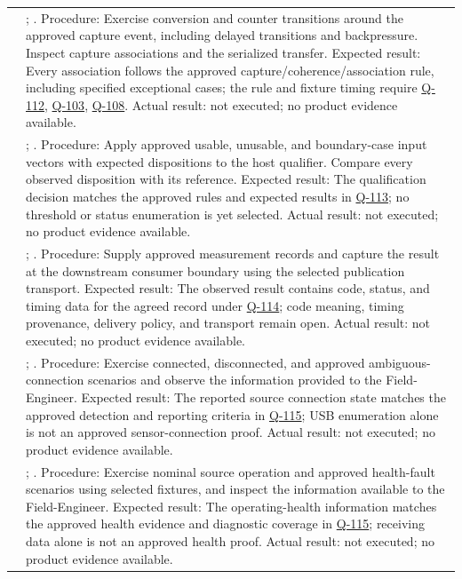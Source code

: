 \begin{tabularx}{\linewidth}{L{2cm}Y}
 & ; . Procedure: Exercise conversion and counter transitions around the approved capture event, including delayed transitions and backpressure. Inspect capture associations and the serialized transfer. Expected result: Every association follows the approved capture/coherence/association rule, including specified exceptional cases; the rule and fixture timing require \hyperref[Question:Q-112]{Q-112}, \hyperref[Question:Q-103]{Q-103}, \hyperref[Question:Q-108]{Q-108}. Actual result: not executed; no product evidence available.\\
 & ; . Procedure: Apply approved usable, unusable, and boundary-case input vectors with expected dispositions to the host qualifier. Compare every observed disposition with its reference. Expected result: The qualification decision matches the approved rules and expected results in \hyperref[Question:Q-113]{Q-113}; no threshold or status enumeration is yet selected. Actual result: not executed; no product evidence available.\\
 & ; . Procedure: Supply approved measurement records and capture the result at the downstream consumer boundary using the selected publication transport. Expected result: The observed result contains code, status, and timing data for the agreed record under \hyperref[Question:Q-114]{Q-114}; code meaning, timing provenance, delivery policy, and transport remain open. Actual result: not executed; no product evidence available.\\
 & ; . Procedure: Exercise connected, disconnected, and approved ambiguous-connection scenarios and observe the information provided to the Field-Engineer. Expected result: The reported source connection state matches the approved detection and reporting criteria in \hyperref[Question:Q-115]{Q-115}; USB enumeration alone is not an approved sensor-connection proof. Actual result: not executed; no product evidence available.\\
 & ; . Procedure: Exercise nominal source operation and approved health-fault scenarios using selected fixtures, and inspect the information available to the Field-Engineer. Expected result: The operating-health information matches the approved health evidence and diagnostic coverage in \hyperref[Question:Q-115]{Q-115}; receiving data alone is not an approved health proof. Actual result: not executed; no product evidence available.\\

\end{tabularx}
